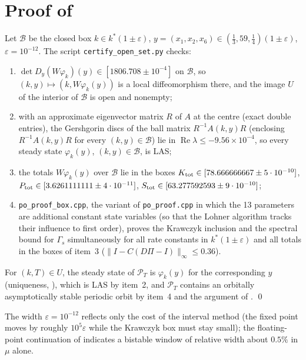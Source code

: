 \documentclass[11pt,a4paper]{report}
\begin{document}
\section{Proof of }\label{sec:proofopen}
Let $\mathcal B$ be the closed box $k\in k^*(1\pm\varepsilon)$, $y=(x_1,x_2,x_6)\in(\tfrac13,59,\tfrac14)(1\pm\varepsilon)$, $\varepsilon=10^{-12}$. The script \texttt{certify\_open\_set.py} checks:
\begin{enumerate}
\item $\det D_y(W\varphi_k)(y)\in[1806.708\pm10^{-4}]$ on $\mathcal B$, so $(k,y)\mapsto(k,W\varphi_k(y))$ is a local diffeomorphism there, and the image $U$ of the interior of $\mathcal B$ is open and nonempty;
\item with an approximate eigenvector matrix $R$ of $A$ at the centre (exact double entries), the Gershgorin discs of the ball matrix $R^{-1}A(k,y)R$ (enclosing $R^{-1}A(k,y)R$ for every $(k,y)\in\mathcal B$) lie in $\operatorname{Re}\lambda\le-9.56\times10^{-4}$, so every steady state $\varphi_k(y)$, $(k,y)\in\mathcal B$, is LAS;
\item the totals $W\varphi_k(y)$ over $\mathcal B$ lie in the boxes $K_{\rm tot}\in[78.666666667\pm5\cdot10^{-10}]$, $P_{\rm tot}\in[3.6261111111\pm4\cdot10^{-11}]$, $S_{\rm tot}\in[63.277592593\pm9\cdot10^{-10}]$;
\item \texttt{po\_proof\_box.cpp}, the variant of \texttt{po\_proof.cpp} in which the 13 parameters are additional constant state variables (so that the Lohner algorithm tracks their influence to first order), proves the Krawczyk inclusion and the spectral bound for $\Gamma_s$ simultaneously for all rate constants in $k^*(1\pm\varepsilon)$ and all totals in the boxes of item~3 ($\|I-C(D\Pi-I)\|_\infty\le0.36$).
\end{enumerate}
For $(k,T)\in U$, the steady state of $\mathcal P_T$ is $\varphi_k(y)$ for the corresponding $y$ (uniqueness, \autocite[Prop.~3.1]{CMS2019}), which is LAS by item~2, and $\mathcal P_T$ contains an orbitally asymptotically stable periodic orbit by item~4 and the argument of . \qed

The width $\varepsilon=10^{-12}$ reflects only the cost of the interval method (the fixed point moves by roughly $10^{5}\varepsilon$ while the Krawczyk box must stay small); the floating-point continuation of  indicates a bistable window of relative width about $0.5\%$ in $\mu$ alone.
\end{document}
